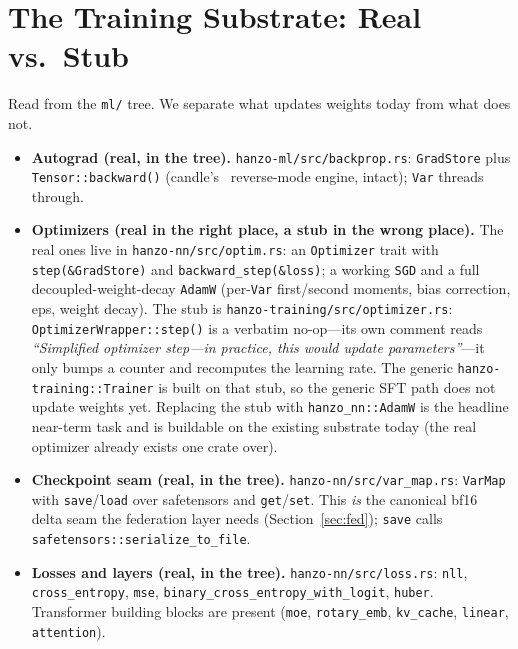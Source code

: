 \documentclass[11pt]{article}
\begin{document}
\section{The Training Substrate: Real vs.\ Stub}
\label{sec:substrate}

Read from the \texttt{ml/} tree. We separate what updates weights today from what does not.

\begin{itemize}
    \item \textbf{Autograd (real, in the tree).} \texttt{hanzo-ml/src/backprop.rs}: \texttt{GradStore} plus \texttt{Tensor::backward()} (candle's~\cite{candle} reverse-mode engine, intact); \texttt{Var} threads through.
    \item \textbf{Optimizers (real in the right place, a stub in the wrong place).} The real ones live in \texttt{hanzo-nn/src/optim.rs}: an \texttt{Optimizer} trait with \texttt{step(\&GradStore)} and \texttt{backward\_step(\&loss)}; a working \texttt{SGD} and a full decoupled-weight-decay \texttt{AdamW} (per-\texttt{Var} first/second moments, bias correction, eps, weight decay). The stub is \texttt{hanzo-training/src/optimizer.rs}: \texttt{OptimizerWrapper::step()} is a verbatim no-op---its own comment reads \emph{``Simplified optimizer step---in practice, this would update parameters''}---it only bumps a counter and recomputes the learning rate. The generic \texttt{hanzo-training::Trainer} is built on that stub, so the generic SFT path does not update weights yet. Replacing the stub with \texttt{hanzo\_nn::AdamW} is the headline near-term task and is buildable on the existing substrate today (the real optimizer already exists one crate over).
    \item \textbf{Checkpoint seam (real, in the tree).} \texttt{hanzo-nn/src/var\_map.rs}: \texttt{VarMap} with \texttt{save}/\texttt{load} over safetensors and \texttt{get}/\texttt{set}. This \emph{is} the canonical bf16 delta seam the federation layer needs (Section~\ref{sec:fed}); \texttt{save} calls \texttt{safetensors::serialize\_to\_file}.
    \item \textbf{Losses and layers (real, in the tree).} \texttt{hanzo-nn/src/loss.rs}: \texttt{nll}, \texttt{cross\_entropy}, \texttt{mse}, \texttt{binary\_cross\_entropy\_with\_logit}, \texttt{huber}. Transformer building blocks are present (\texttt{moe}, \texttt{rotary\_emb}, \texttt{kv\_cache}, \texttt{linear}, \texttt{attention}).

\end{itemize}
\end{document}
